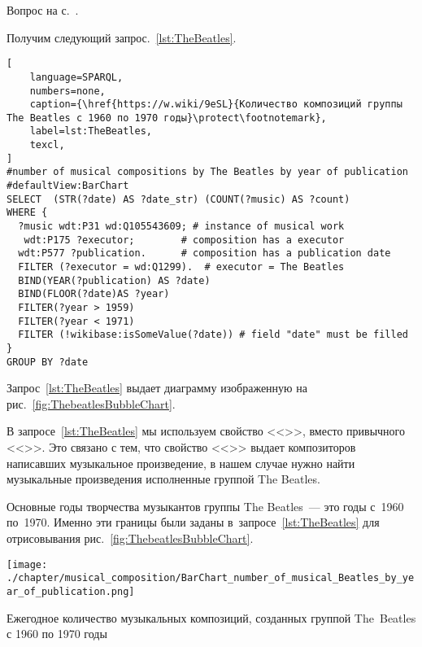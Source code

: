\begin{task}
    \AnswerBackref Вопрос на с.~\pageref{question:TheBeatles_quest}.
    \label{answer:TheBeatles_answ}

    Получим следующий запрос.~\ref{lst:TheBeatles}.
\begin{lstlisting}[ 
    language=SPARQL, 
    numbers=none,
    caption={\href{https://w.wiki/9eSL}{Количество композиций группы The Beatles с 1960 по 1970 годы}\protect\footnotemark},
    label=lst:TheBeatles,
    texcl,
]
#number of musical compositions by The Beatles by year of publication
#defaultView:BarChart
SELECT  (STR(?date) AS ?date_str) (COUNT(?music) AS ?count)  
WHERE {
  ?music wdt:P31 wd:Q105543609; # instance of musical work
   wdt:P175 ?executor;        # composition has a executor
  wdt:P577 ?publication.      # composition has a publication date
  FILTER (?executor = wd:Q1299).  # executor = The Beatles
  BIND(YEAR(?publication) AS ?date)
  BIND(FLOOR(?date)AS ?year)
  FILTER(?year > 1959)
  FILTER(?year < 1971) 
  FILTER (!wikibase:isSomeValue(?date)) # field "date" must be filled
}
GROUP BY ?date
\end{lstlisting}%

Запрос~\ref{lst:TheBeatles} выдает диаграмму изображенную на рис.~\ref{fig:ThebeatlesBubbleChart}.

В запросе~\ref{lst:TheBeatles} мы используем свойство <<>>, вместо привычного <<>>. Это связано с тем, что свойство <<>> выдает композиторов написавших музыкальное произведение, в нашем случае нужно найти музыкальные произведения исполненные группой The Beatles.

    Основные годы творчества музыкантов группы The Beatles~--- это годы с~1960 по~1970. 
    Именно эти границы были заданы в~запросе~\ref{lst:TheBeatles} 
    для отрисовывания рис.~\ref{fig:ThebeatlesBubbleChart}.

\begin{marginfigure}
	\texttt{[image: ./chapter/musical\_composition/BarChart\_number\_of\_musical\_Beatles\_by\_year\_of\_publication.png]}
	\caption[Гистограмма количества музыкальных композиций The Beatles с 1960 по 1970 годы]
    {Ежегодное количество музыкальных композиций, созданных группой The~Beatles с 1960 по 1970 годы}%
 	\label{fig:ThebeatlesBubbleChart}%
\end{marginfigure}
\end{task}



